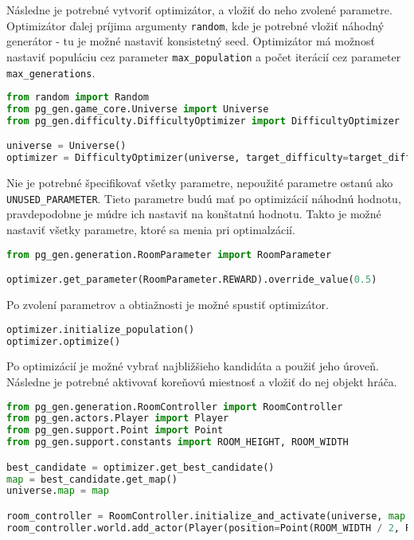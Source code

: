 Následne je potrebné vytvoriť optimizátor, a vložiť do neho zvolené parametre. Optimizátor ďalej príjima argumenty \texttt{random}, kde je potrebné vložiť náhodný generátor - tu je možné nastaviť konsistetný seed. Optimizátor má možnosť nastaviť populáciu cez parameter \texttt{max\_population} a počet iterácií cez parameter \texttt{max\_generations}.

\begin{lstlisting}[language=python]
from random import Random
from pg_gen.game_core.Universe import Universe
from pg_gen.difficulty.DifficultyOptimizer import DifficultyOptimizer

universe = Universe()
optimizer = DifficultyOptimizer(universe, target_difficulty=target_difficulty, random=Random(108561))
\end{lstlisting}

Nie je potrebné špecifikovať všetky parametre, nepoužité parametre ostanú ako \texttt{UNUSED\_PARAMETER}. Tieto parametre budú mať po optimizácií náhodnú hodnotu, pravdepodobne je múdre ich nastaviť na konštatnú hodnotu. Takto je možné nastaviť všetky parametre, ktoré sa menia pri optimalzácií.

\begin{lstlisting}[language=python]
from pg_gen.generation.RoomParameter import RoomParameter

optimizer.get_parameter(RoomParameter.REWARD).override_value(0.5)
\end{lstlisting}

Po zvolení parametrov a obtiažnosti je možné spustiť optimizátor.

\begin{lstlisting}[language=python]
optimizer.initialize_population()
optimizer.optimize()
\end{lstlisting}

Po optimizácií je možné vybrať najbližšieho kandidáta a použiť jeho úroveň. Následne je potrebné aktivovať koreňovú miestnosť a vložiť do nej objekt hráča.

\begin{lstlisting}[language=python]
from pg_gen.generation.RoomController import RoomController
from pg_gen.actors.Player import Player
from pg_gen.support.Point import Point
from pg_gen.support.constants import ROOM_HEIGHT, ROOM_WIDTH

best_candidate = optimizer.get_best_candidate()
map = best_candidate.get_map()
universe.map = map

room_controller = RoomController.initialize_and_activate(universe, map.get_room(Point.ZERO), None)
room_controller.world.add_actor(Player(position=Point(ROOM_WIDTH / 2, ROOM_HEIGHT / 2)))
\end{lstlisting}

